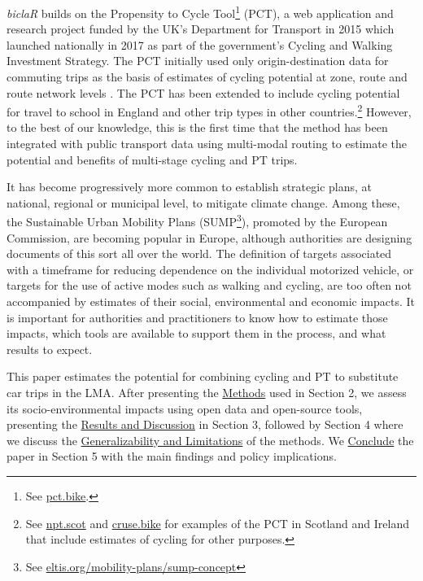 \documentclass[review, doubleblind, 3p,
authoryear]{elsarticle} %
\begin{document}
\emph{biclaR} builds on the Propensity to Cycle Tool\footnote{See
  \href{https://www.pct.bike/}{pct.bike}.} (PCT), a web application and
research project funded by the UK's Department for Transport in 2015
which launched nationally in 2017 as part of the government's Cycling
and Walking Investment Strategy. The PCT initially used only
origin-destination data for commuting trips as the basis of estimates of
cycling potential at zone, route and route network levels
\citep{lovelace2017}. The PCT has been extended to include cycling
potential for travel to school in England \citep{goodman2019} and other
trip types in other countries.\footnote{See
  \href{https://www.npt.scot}{npt.scot} and
  \href{https://cruse.bike}{cruse.bike} for examples of the PCT in
  Scotland and Ireland that include estimates of cycling for other
  purposes.} However, to the best of our knowledge, this is the first
time that the method has been integrated with public transport data
using multi-modal routing to estimate the potential and benefits of
multi-stage cycling and PT trips.

It has become progressively more common to establish strategic plans, at
national, regional or municipal level, to mitigate climate change. Among
these, the Sustainable Urban Mobility Plans (SUMP\footnote{See
  \href{https://www.eltis.org/mobility-plans/sump-concept}{eltis.org/mobility-plans/sump-concept}}),
promoted by the European Commission, are becoming popular in Europe,
although authorities are designing documents of this sort all over the
world. The definition of targets associated with a timeframe for
reducing dependence on the individual motorized vehicle, or targets for
the use of active modes such as walking and cycling, are too often not
accompanied by estimates of their social, environmental and economic
impacts. It is important for authorities and practitioners to know how
to estimate those impacts, which tools are available to support them in
the process, and what results to expect.

This paper estimates the potential for combining cycling and PT to
substitute car trips in the LMA. After presenting the
\hyperref[methods]{Methods} used in Section 2, we assess its
socio-environmental impacts using open data and open-source tools,
presenting the \hyperref[results-and-discussion]{Results and Discussion}
in Section 3, followed by Section 4 where we discuss the
\hyperref[generalizability-and-limitations]{Generalizability and
Limitations} of the methods. We \hyperref[Conclusions]{Conclude} the
paper in Section 5 with the main findings and policy implications.
\end{document}
